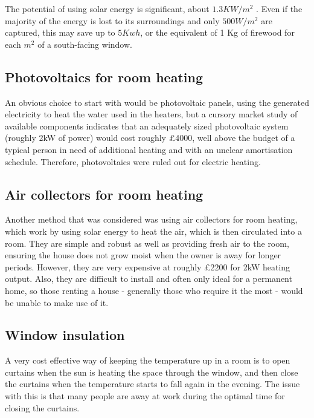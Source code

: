 \documentclass[a4paper,12pt]{article}
\begin{document}
The potential of using solar energy is significant, about $1.3 KW/m^2$ \cite{url:solarConstant}. 
Even if the majority of the energy is lost to its surroundings and only $500 W/m^2$ are captured, 
this may save up to $5 Kwh$, or the equivalent of 1 Kg of firewood for each $m^2$ of a south-facing window. 

\subsection{Photovoltaics for room heating}

An obvious choice to start with would be photovoltaic panels, using the generated electricity to heat the water used in the heaters, 
but a cursory market study of available components indicates that an adequately sized photovoltaic system (roughly 2kW of power) 
would cost roughly £4000\cite{url:solarEnergyStore}, well above the budget of a typical person in need of additional heating  
and with an unclear amortisation schedule. 
Therefore, photovoltaics were ruled out for electric heating.

\subsection{Air collectors for room heating}

Another method that was considered was using air collectors for room heating, which work by using solar energy to heat the air, which is then circulated into a room. 
They are simple and robust as well as providing fresh air to the room, ensuring the house does not grow moist when the owner is away for longer periods. 
However, they are very expensive at roughly £2200 for 2kW heating output\cite{url:solarVenti}. Also, they are difficult to install and often only ideal for a permanent home, 
so those renting a house - generally those who require it the most - would be unable to make use of it.

\subsection{Window insulation}

A very cost effective way of keeping the temperature up in a room is to open curtains when the sun is heating the space through the window, 
and then close the curtains when the temperature starts to fall again in the evening. 
The issue with this is that many people are away at work during the optimal time for closing the curtains.
\end{document}
